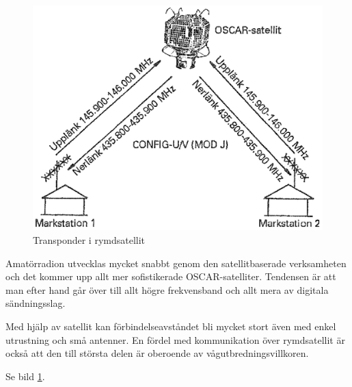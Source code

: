 \begin{figure}
  \includegraphics[width=\textwidth]{images/cropped_pdfs/bild_2_7-13.pdf}
  \caption{Transponder i rymdsatellit}
  \label{fig:bildII7-13}
\end{figure}

Amatörradion utvecklas mycket snabbt genom den satellitbaserade
verksamheten och det kommer upp allt mer sofistikerade
OSCAR-satelliter. Tendensen är att man efter hand går över till allt
högre frekvensband och allt mera av digitala sändningsslag.

Med hjälp av satellit kan förbindelseavståndet bli mycket stort även
med enkel utrustning och små antenner. En fördel med kommunikation
över rymdsatellit är också att den till största delen är oberoende av
vågutbredningsvillkoren.

Se bild \ref{fig:bildII7-13}.
